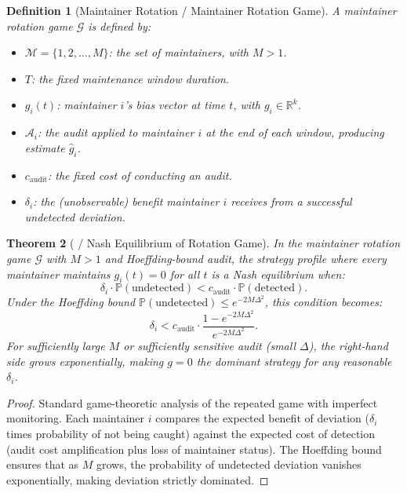 \documentclass[12pt,a4paper]{article}
\newtheorem{theorem}{Theorem}[section]
\newtheorem{definition}[theorem]{Definition}
\theoremstyle{remark}
\newcommand{\R}{\mathbb{R}}
\newcommand{\Pbb}{\mathbb{P}}
\newcommand{\deviate}{\delta}
\newcommand{\auditCost}{c_{\text{audit}}}
\newcommand{\rotationPeriod}{T}
\newcommand{\numMaintainers}{M}
\newcommand{\biasParam}{g}
\begin{document}
\begin{definition}[Maintainer Rotation / Maintainer Rotation Game]
A maintainer rotation game $\mathcal{G}$ is defined by:
\begin{itemize}[leftmargin=*]
    \item $\mathcal{M} = \{1, 2, \ldots, \numMaintainers\}$: the set of
          maintainers, with $\numMaintainers > 1$.
    \item $\rotationPeriod$: the fixed maintenance window duration.
    \item $\biasParam_i(t)$: maintainer $i$'s bias vector at time $t$,
          with $\biasParam_i \in \R^k$.
    \item $\mathcal{A}_i$: the audit applied to maintainer $i$ at the
          end of each window, producing estimate $\hat{g}_i$.
    \item $\auditCost$: the fixed cost of conducting an audit.
    \item $\deviate_i$: the (unobservable) benefit maintainer $i$ receives
          from a successful undetected deviation.
\end{itemize}
\end{definition}

\begin{theorem}[ / Nash Equilibrium of Rotation Game]
\label{thm:rotation-nash}
In the maintainer rotation game $\mathcal{G}$ with $\numMaintainers > 1$
and Hoeffding-bound audit, the strategy profile where every maintainer
maintains $\biasParam_i(t) = 0$ for all $t$ is a Nash equilibrium when:
\begin{equation}
    \deviate_i \cdot \Pbb(\text{undetected}) < \auditCost \cdot
    \Pbb(\text{detected}).
\end{equation}
Under the Hoeffding bound $\Pbb(\text{undetected}) \leq e^{-2M\Delta^2}$,
this condition becomes:
\begin{equation}
    \deviate_i < \auditCost \cdot \frac{1 - e^{-2M\Delta^2}}
    {e^{-2M\Delta^2}}.
\end{equation}
For sufficiently large $\numMaintainers$ or sufficiently sensitive audit
(small $\Delta$), the right-hand side grows exponentially, making $g=0$
the dominant strategy for any reasonable $\deviate_i$.
\end{theorem}

\begin{proof}
Standard game-theoretic analysis of the repeated game with imperfect
monitoring. Each maintainer $i$ compares the expected benefit of deviation
($\deviate_i$ times probability of not being caught) against the expected
cost of detection (audit cost amplification plus loss of maintainer status).
The Hoeffding bound ensures that as $M$ grows, the probability of undetected
deviation vanishes exponentially, making deviation strictly dominated.
\end{proof}
\end{document}
